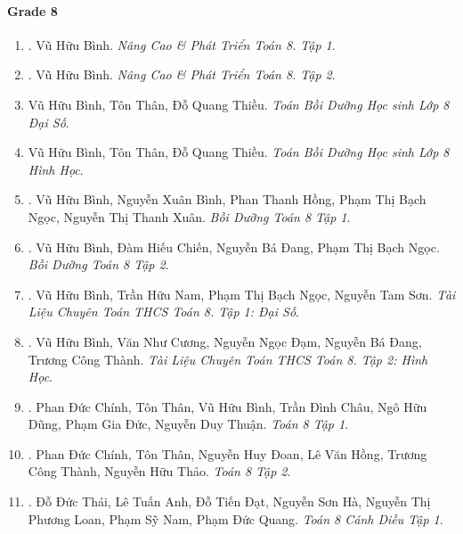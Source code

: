 \documentclass{article}
\begin{document}
\paragraph{Grade 8}

\begin{enumerate}
	\item \cite{Binh_Toan_8_tap_1}. Vũ Hữu Bình. {\it Nâng Cao \& Phát Triển Toán 8. Tập 1}.\hfill{\sf[reading]}
	
	\item \cite{Binh_Toan_8_tap_2}. Vũ Hữu Bình. {\it Nâng Cao \& Phát Triển Toán 8. Tập 2}.\hfill{\sf[reading]}
	
	\item Vũ Hữu Bình, Tôn Thân, Đỗ Quang Thiều. {\it Toán Bồi Dưỡng Học sinh Lớp 8 Đại Số}.
	
	\item Vũ Hữu Bình, Tôn Thân, Đỗ Quang Thiều. {\it Toán Bồi Dưỡng Học sinh Lớp 8 Hình Học}.
	
	\item \cite{Binh_boi_duong_Toan_8_tap_1}. Vũ Hữu Bình, Nguyễn Xuân Bình, Phan Thanh Hồng, Phạm Thị Bạch Ngọc, Nguyễn Thị Thanh Xuân. {\it Bồi Dưỡng Toán 8 Tập 1}.\hfill{\sf[reading]}
	
	\item \cite{Binh_boi_duong_Toan_8_tap_2}. Vũ Hữu Bình, Đàm Hiếu Chiến, Nguyễn Bá Đang, Phạm Thị Bạch Ngọc. {\it Bồi Dưỡng Toán 8 Tập 2}.\hfill{\sf[reading]}
	
	\item \cite{TLCT_THCS_Toan_8_dai_so}. Vũ Hữu Bình, Trần Hữu Nam, Phạm Thị Bạch Ngọc, Nguyễn Tam Sơn. {\it Tài Liệu Chuyên Toán THCS Toán 8. Tập 1: Đại Số}.\hfill{\sf[reading]}
	
	\item \cite{TLCT_THCS_Toan_8_hinh_hoc}. Vũ Hữu Bình, Văn Như Cương, Nguyễn Ngọc Đạm, Nguyễn Bá Đang, Trương Công Thành. {\it Tài Liệu Chuyên Toán THCS Toán 8. Tập 2: Hình Học}.\hfill{\sf[reading]}
	
	\item \cite{SGK_Toan_8_tap_1}. Phan Đức Chính, Tôn Thân, Vũ Hữu Bình, Trần Đình Châu, Ngô Hữu Dũng, Phạm Gia Đức, Nguyễn Duy
	Thuận. {\it Toán 8 Tập 1}.\hfill{\sf[done]}
	
	\item \cite{SGK_Toan_8_tap_2}. Phan Đức Chính, Tôn Thân, Nguyễn Huy Đoan, Lê Văn Hồng, Trương Công Thành, Nguyễn Hữu Thảo. {\it Toán 8 Tập 2}.\hfill{\sf[done]}
	
	\item \cite{SGK_Toan_8_Canh_Dieu_tap_1}. Đỗ Đức Thái, Lê Tuấn Anh, Đỗ Tiến Đạt, Nguyễn Sơn Hà, Nguyễn Thị Phương Loan, Phạm Sỹ Nam, Phạm Đức Quang. {\it Toán 8 Cánh Diều Tập 1}.\hfill{\sf[reading]}
	

\end{enumerate}
\end{document}
